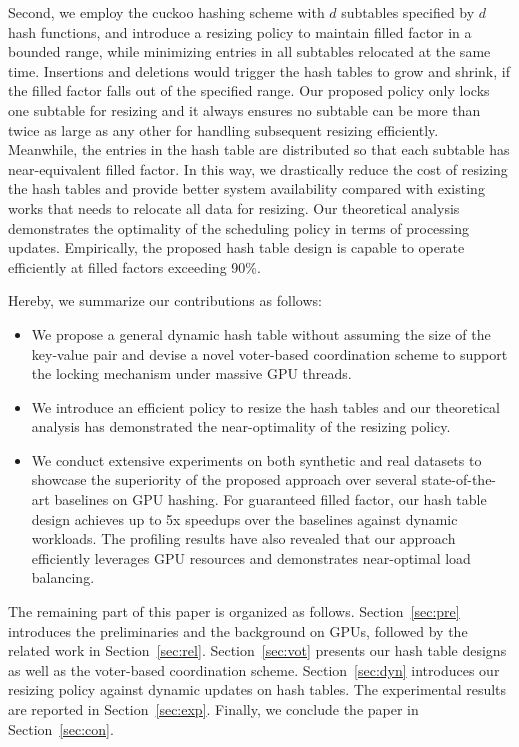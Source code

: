 Second, we employ the cuckoo hashing scheme with $d$ subtables specified by $d$ hash functions, and introduce a resizing policy to maintain filled factor in a bounded range, while minimizing entries in all subtables relocated at the same time. Insertions and deletions would trigger the hash tables to grow and shrink, if the filled factor falls out of the specified range. 
Our proposed policy only locks one subtable for resizing and it always ensures no subtable can be more than twice as large as any other for handling subsequent resizing efficiently. Meanwhile, the entries in the hash table are distributed so that each subtable has near-equivalent filled factor.
In this way, we drastically reduce the cost of resizing the hash tables and provide better system availability compared with existing works that needs to relocate all data for resizing.
Our theoretical analysis demonstrates the optimality of the scheduling policy in terms of processing updates. 
Empirically, the proposed hash table design is capable to operate efficiently at filled factors exceeding 90\%.

Hereby, we summarize our contributions as follows:
\begin{itemize}
	\item We propose a general dynamic hash table without assuming the size of the key-value pair and devise a novel voter-based coordination scheme to support the locking mechanism under massive GPU threads. 
	\item We introduce an efficient policy to resize the hash tables and our theoretical analysis has demonstrated the near-optimality of the resizing policy.
	\item We conduct extensive experiments on both synthetic and real datasets to showcase the superiority of the proposed approach over several state-of-the-art baselines on GPU hashing. 
	For guaranteed filled factor, our hash table design achieves up to 5x speedups over the baselines against dynamic workloads. The profiling results have also revealed that our approach efficiently leverages GPU resources and demonstrates near-optimal load balancing. 
\end{itemize}

The remaining part of this paper is organized as follows. Section~\ref{sec:pre} introduces the preliminaries and the background on GPUs, followed by the related work in Section~\ref{sec:rel}. Section~\ref{sec:vot} presents our hash table designs as well as the voter-based coordination scheme.  Section~\ref{sec:dyn} introduces our resizing policy against dynamic updates on hash tables. The experimental results are reported in Section~\ref{sec:exp}. Finally, we conclude the paper in Section~\ref{sec:con}. 